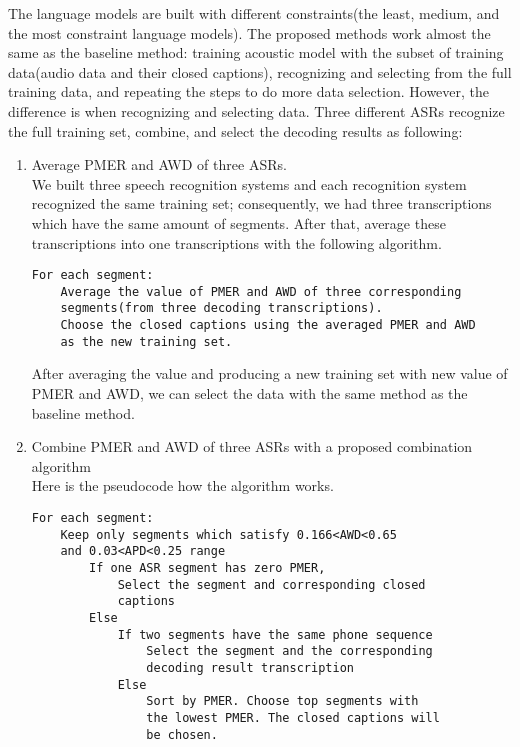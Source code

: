 The language models are built with different constraints(the least, medium, and the most constraint language models). The proposed methods work almost the same as the baseline method: training acoustic model with the subset of training data(audio data and their closed captions), recognizing and selecting from the full training data, and repeating the steps to do more data selection. However, the difference is when recognizing and selecting data. Three different ASRs recognize the full training set, combine, and select the decoding results as following:
\begin{enumerate}
\item Average PMER and AWD of three ASRs. \\
We built three speech recognition systems and each recognition system recognized the same training set; consequently, we had three transcriptions which have the same amount of segments. After that, average these transcriptions into one transcriptions with the following algorithm.
\begin{lstlisting}[caption={the proposed averaging algorithm}]
For each segment:
	Average the value of PMER and AWD of three corresponding 
	segments(from three decoding transcriptions).
	Choose the closed captions using the averaged PMER and AWD 
	as the new training set.
\end{lstlisting}
After averaging the value and producing a new training set with new value of PMER and AWD, we can select the data with the same method as the baseline method.


\item Combine PMER and AWD of three ASRs with a proposed combination algorithm \\
Here is the pseudocode how the algorithm works.
\begin{lstlisting}[caption={the proposed combination algorithm}, label={algoCombine}]
For each segment:
    Keep only segments which satisfy 0.166<AWD<0.65 
    and 0.03<APD<0.25 range
        If one ASR segment has zero PMER, 
            Select the segment and corresponding closed 
            captions
        Else 
            If two segments have the same phone sequence 
                Select the segment and the corresponding 
                decoding result transcription 
            Else 
                Sort by PMER. Choose top segments with 
                the lowest PMER. The closed captions will 
                be chosen.
\end{lstlisting}


\end{enumerate}
